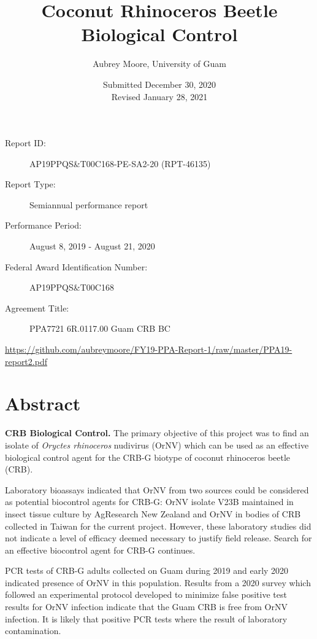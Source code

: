 \documentclass[12pt,letterpaper,english,bibliography=totocnumbered,abstract=on]{scrartcl}
\begin{document}
\titlehead{USDA-APHIS Progress Report}
\title{Coconut Rhinoceros Beetle Biological Control}
\author{Aubrey Moore, University of Guam}
\date{Submitted December 30, 2020\\Revised January 28, 2021}
\maketitle
\begin{description}	
	\item[Report ID:] AP19PPQS\&T00C168-PE-SA2-20 (RPT-46135)
	\item[Report Type:] Semiannual performance report
	\item[Performance Period:] August 8, 2019 - August 21, 2020
	\item[Federal Award Identification Number:] AP19PPQS\&T00C168
	\item[Agreement Title:] PPA7721 6R.0117.00 Guam CRB BC
\end{description}

\begin{footnotesize}
\url{https://github.com/aubreymoore/FY19-PPA-Report-1/raw/master/PPA19-report2.pdf}
\end{footnotesize}

\newpage{}
\tableofcontents{}

\newpage
\listoftodos

\newpage

\section{Abstract}
	
	
	\textbf{CRB Biological Control.} The primary objective of this project was to find an isolate of \textit{Oryctes rhinoceros} nudivirus (OrNV) which can be used as an effective biological control agent for the CRB-G biotype of coconut rhinoceros beetle (CRB). 
	
	Laboratory bioassays indicated that OrNV from two sources could be considered as potential biocontrol agents for CRB-G: OrNV isolate V23B maintained in insect tissue culture by AgResearch New Zealand and OrNV in bodies of CRB collected in Taiwan for the current project. However, these laboratory studies did not indicate a level of efficacy deemed necessary to justify field release. Search for an effective biocontrol agent for CRB-G continues. 
	
	PCR tests of CRB-G adults collected on Guam during 2019 and early 2020 indicated presence of OrNV in this population. Results from a 2020 survey which followed an experimental protocol developed to minimize false positive test results for OrNV infection indicate that the Guam CRB is free from OrNV infection.  It is likely that positive PCR tests where the result of laboratory contamination. 	
	
\end{document}
